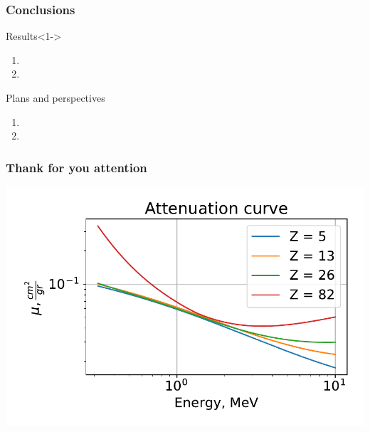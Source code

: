 \documentclass[11pt]{beamer}
\begin{document}
\begin{frame}
    \frametitle{Conclusions}
    
    \begin{block}{Results}<1->
    \begin{enumerate}
        \item%
        \item%
    \end{enumerate}
    \end{block}
\begin{block}{Plans and perspectives}%
    \begin{enumerate}
        \item%
        \item%
    \end{enumerate}
%   
%   
\end{block}

\end{frame}

\begin{frame}
    \frametitle{Thank for you attention}
            \includegraphics[width=1\textwidth]{figures/Attenuation.pdf}
\end{frame}
\end{document}
